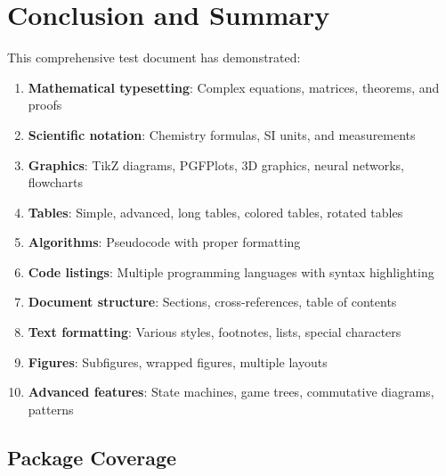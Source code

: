 \documentclass[11pt,a4paper]{article}
\theoremstyle{definition}
\begin{document}
\section{Conclusion and Summary}

This comprehensive test document has demonstrated:

\begin{enumerate}
    \item \textbf{Mathematical typesetting}: Complex equations, matrices, theorems, and proofs
    \item \textbf{Scientific notation}: Chemistry formulas, SI units, and measurements
    \item \textbf{Graphics}: TikZ diagrams, PGFPlots, 3D graphics, neural networks, flowcharts
    \item \textbf{Tables}: Simple, advanced, long tables, colored tables, rotated tables
    \item \textbf{Algorithms}: Pseudocode with proper formatting
    \item \textbf{Code listings}: Multiple programming languages with syntax highlighting
    \item \textbf{Document structure}: Sections, cross-references, table of contents
    \item \textbf{Text formatting}: Various styles, footnotes, lists, special characters
    \item \textbf{Figures}: Subfigures, wrapped figures, multiple layouts
    \item \textbf{Advanced features}: State machines, game trees, commutative diagrams, patterns
\end{enumerate}

\subsection{Package Coverage}
\end{document}
